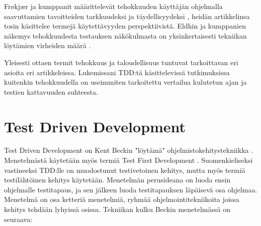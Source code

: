 \documentclass[finnish]{tktltiki2}
\theoremstyle{definition}
\theoremstyle{remark}
\begin{document}
Frøkjær ja kumppanit määrittelevät tehokkuuden käyttäjän ohjelmalla saavuttamien tavoitteiden tarkkuudeksi ja täydellisyydeksi \cite{Frokjaer00}, heidän artikkelinsa tosin käsittelee termejä käytettävyyden perspektiivistä. Eldhin ja kumppanien näkemys tehokkuudesta testauksen näkökulmasta on yksinkertaisesti tekniikan löytämien virheiden määrä \cite{Eldh06}.



Yleisesti ottaen termit tehokkuus ja taloudellisuus tuntuvat tarkoittavan eri asioita eri artikkeleissa. Lukemissani TDD:tä käsittelevissä tutkimuksissa kuitenkin tehokkuudella on useimmiten tarkoitettu vertailua kulutetun ajan ja testien kattavuuden suhteesta. 





\section{Test Driven Development}


Test Driven Development on Kent Beckin "löytämä" ohjelmistokehitystekniikka \cite{Beck03}. Menetelmästä käytetään myös termiä Test First Development \cite{Crispin06}. Suomenkieliseksi vastineeksi TDD:lle on muodostunut testivetoinen kehitys, mutta myös termiä testilähtöinen kehitys käytetään. Menetelmän perusideana on luoda ensin ohjelmalle testitapaus, ja sen jälkeen luoda testitapauksen läpäisevä osa ohjelmaa. Menetelmä on osa ketteriä menetelmiä, ryhmää ohjelmointitekniikoita joissa kehitys tehdään lyhyissä osissa. Tekniikan kulku Beckin menetelmässä on seuraava:
\end{document}

